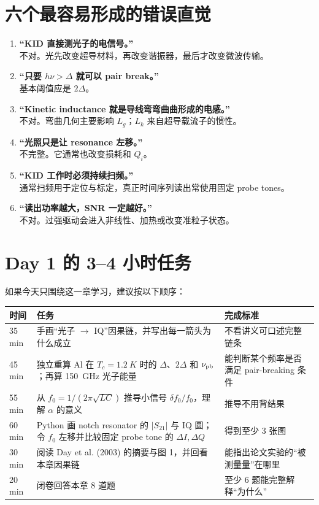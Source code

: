 \documentclass[11pt,a4paper,openany]{ctexrep}
\begin{document}
\section{六个最容易形成的错误直觉}
\begin{enumerate}
  \item \textbf{“KID 直接测光子的电信号。”}\\
  不对。光先改变超导材料，再改变谐振器，最后才改变微波传输。
  \item \textbf{“只要 $h\nu>\Delta$ 就可以 pair break。”}\\
  基本阈值应是 $2\Delta$。
  \item \textbf{“Kinetic inductance 就是导线弯弯曲曲形成的电感。”}\\
  不对。弯曲几何主要影响 $L_g$；$L_k$ 来自超导载流子的惯性。
  \item \textbf{“光照只是让 resonance 左移。”}\\
  不完整。它通常也改变损耗和 $Q_i$。
  \item \textbf{“KID 工作时必须持续扫频。”}\\
  通常扫频用于定位与标定，真正时间序列读出常使用固定 probe tones。
  \item \textbf{“读出功率越大，SNR 一定越好。”}\\
  不对。过强驱动会进入非线性、加热或改变准粒子状态。
\end{enumerate}

\section{Day 1 的 3--4 小时任务}
如果今天只围绕这一章学习，建议按以下顺序：

\noindent\begin{tabularx}{\textwidth}{p{1.8cm} X X}
\toprule
时间 & 任务 & 完成标准 \\
\midrule
35 min & 手画“光子 $\rightarrow$ IQ”因果链，并写出每一箭头为什么成立 & 不看讲义可口述完整链条 \\
45 min & 独立重算 Al 在 $T_c=\SI{1.2}{K}$ 时的 $\Delta$、$2\Delta$ 和 $\nu_{\rm pb}$；再算 \SI{150}{GHz} 光子能量 & 能判断某个频率是否满足 pair-breaking 条件 \\
55 min & 从 $f_0=1/(2\pi\sqrt{LC})$ 推导小信号 $\delta f_0/f_0$，理解 $\alpha$ 的意义 & 推导不用背结果 \\
60 min & Python 画 notch resonator 的 $|S_{21}|$ 与 IQ 圆；令 $f_0$ 左移并比较固定 probe tone 的 $\Delta I,\Delta Q$ & 得到至少 3 张图 \\
30 min & 阅读 Day et al. (2003) 的摘要与图 1，并回看本章因果链 & 能指出论文实验的“被测量量”在哪里 \\
20 min & 闭卷回答本章 8 道题 & 至少 6 题能完整解释“为什么” \\
\bottomrule
\end{tabularx}
\end{document}
